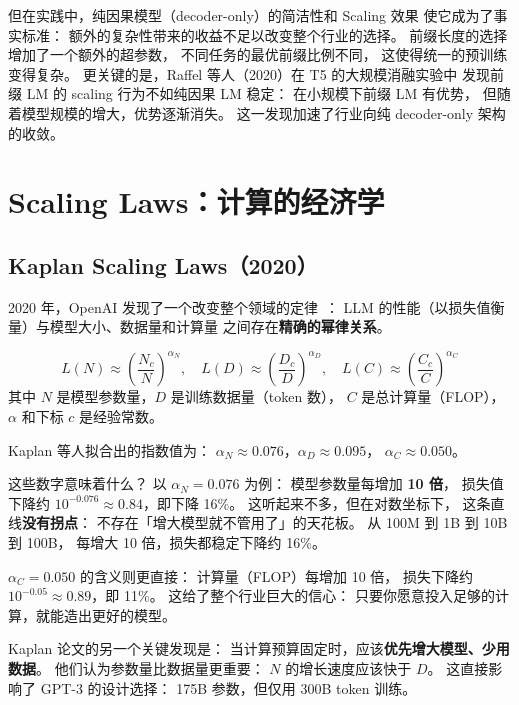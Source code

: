 但在实践中，纯因果模型（decoder-only）的简洁性和 Scaling 效果
使它成为了事实标准：
额外的复杂性带来的收益不足以改变整个行业的选择。
前缀长度的选择增加了一个额外的超参数，
不同任务的最优前缀比例不同，
这使得统一的预训练变得复杂。
更关键的是，Raffel 等人（2020）在 T5 的大规模消融实验中
发现前缀 LM 的 scaling 行为不如纯因果 LM 稳定：
在小规模下前缀 LM 有优势，
但随着模型规模的增大，优势逐渐消失。
这一发现加速了行业向纯 decoder-only 架构的收敛。

\section{Scaling Laws：计算的经济学}
\label{sec:pretrain-scaling-laws}

\subsection{Kaplan Scaling Laws（2020）}

2020 年，OpenAI 发现了一个改变整个领域的定律~\cite{kaplan2020scaling}：
LLM 的性能（以损失值衡量）与模型大小、数据量和计算量
之间存在\textbf{精确的幂律关系}。

\begin{equation}
  L(N) \approx \left(\frac{N_c}{N}\right)^{\alpha_N}, \quad
  L(D) \approx \left(\frac{D_c}{D}\right)^{\alpha_D}, \quad
  L(C) \approx \left(\frac{C_c}{C}\right)^{\alpha_C}
  \label{eq:scaling}
\end{equation}
其中 $N$ 是模型参数量，$D$ 是训练数据量（token 数），
$C$ 是总计算量（FLOP），
$\alpha$ 和下标 $c$ 是经验常数。

Kaplan 等人拟合出的指数值为：
$\alpha_N \approx 0.076$，$\alpha_D \approx 0.095$，
$\alpha_C \approx 0.050$。

这些数字意味着什么？
以 $\alpha_N = 0.076$ 为例：
模型参数量每增加 \textbf{10 倍}，
损失值下降约 $10^{-0.076} \approx 0.84$，即下降 16\%。
这听起来不多，但在对数坐标下，
这条直线\textbf{没有拐点}：
不存在「增大模型就不管用了」的天花板。
从 100M 到 1B 到 10B 到 100B，
每增大 10 倍，损失都稳定下降约 16\%。

$\alpha_C = 0.050$ 的含义则更直接：
计算量（FLOP）每增加 10 倍，
损失下降约 $10^{-0.05} \approx 0.89$，即 11\%。
这给了整个行业巨大的信心：
只要你愿意投入足够的计算，就能造出更好的模型。

Kaplan 论文的另一个关键发现是：
当计算预算固定时，应该\textbf{优先增大模型、少用数据}。
他们认为参数量比数据量更重要：
$N$ 的增长速度应该快于 $D$。
这直接影响了 GPT-3 的设计选择：
175B 参数，但仅用 300B token 训练。


